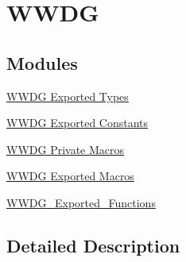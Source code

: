 \hypertarget{group___w_w_d_g}{}\section{W\+W\+DG}
\label{group___w_w_d_g}
\subsection*{Modules}
\begin{DoxyCompactItemize}
\item 
\hyperlink{group___w_w_d_g___exported___types}{W\+W\+D\+G Exported Types}
\item 
\hyperlink{group___w_w_d_g___exported___constants}{W\+W\+D\+G Exported Constants}
\item 
\hyperlink{group___w_w_d_g___private___macros}{W\+W\+D\+G Private Macros}
\item 
\hyperlink{group___w_w_d_g___exported___macros}{W\+W\+D\+G Exported Macros}
\item 
\hyperlink{group___w_w_d_g___exported___functions}{W\+W\+D\+G\+\_\+\+Exported\+\_\+\+Functions}
\end{DoxyCompactItemize}


\subsection{Detailed Description}
